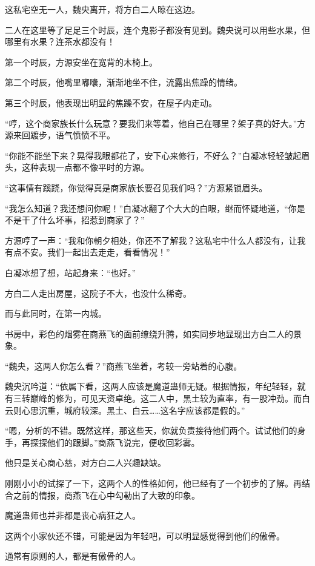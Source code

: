 \begin{this_body}
这私宅空无一人，魏央离开，将方白二人晾在这边。

二人在这里等了足足三个时辰，连个鬼影子都没有见到。魏央说可以用些水果，但哪里有水果？连茶水都没有！

第一个时辰，方源安坐在宽背的木椅上。

第二个时辰，他嘴里嘟囔，渐渐地坐不住，流露出焦躁的情绪。

第三个时辰，他表现出明显的焦躁不安，在屋子内走动。

“哼，这个商家族长什么玩意？要我们来等着，他自己在哪里？架子真的好大。”方源来回踱步，语气愤愤不平。

“你能不能坐下来？晃得我眼都花了，安下心来修行，不好么？”白凝冰轻轻皱起眉头，这种表现一点都不像平时的方源。

“这事情有蹊跷，你觉得真是商家族长要召见我们吗？”方源紧锁眉头。

“我怎么知道？我还想问你呢！”白凝冰翻了个大大的白眼，继而怀疑地道，“你是不是干了什么坏事，招惹到商家了？”

方源哼了一声：“我和你朝夕相处，你还不了解我？这私宅中什么人都没有，让我有点不安。我们一起出去走走，看看情况！”

白凝冰想了想，站起身来：“也好。”

方白二人走出房屋，这院子不大，也没什么稀奇。

而与此同时，在第一内城。

书房中，彩色的烟雾在商燕飞的面前缭绕升腾，如实同步地显现出方白二人的景象。

“魏央，这两人你怎么看？”商燕飞坐着，考较一旁站着的心腹。

魏央沉吟道：“依属下看，这两人应该是魔道蛊师无疑。根据情报，年纪轻轻，就有三转巅峰的修为，可见天资卓绝。这二人中，黑土较为直率，有一股冲劲。而白云则心思沉重，城府较深。黑土、白云……这名字应该都是假的。”

“嗯，分析的不错。既然这样，那这些天，你就负责接待他们两个。试试他们的身手，再探探他们的跟脚。”商燕飞说完，便收回彩雾。

他只是关心商心慈，对方白二人兴趣缺缺。

刚刚小小的试探了一下，这两个人的性格如何，他已经有了一个初步的了解。再结合之前的情报，商燕飞在心中勾勒出了大致的印象。

魔道蛊师也并非都是丧心病狂之人。

这两个小家伙还不错，可能是因为年轻吧，可以明显感觉得到他们的傲骨。

通常有原则的人，都是有傲骨的人。


\end{this_body}
